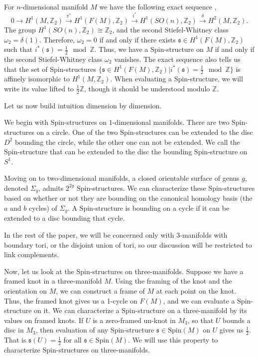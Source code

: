 \documentclass{article}
\newcommand{\Z}{{\mathbb Z}}
\def\be{\begin{equation}}
\def\ee{\end{equation}}
\numberwithin{corollary}{theorem}
\numberwithin{corollary}{proposition}
\begin{document}
For $n$-dimensional manifold $M$ we have the following exact sequence \cite{Milnor1965},
\be 
0 \rightarrow H^{1}(M, \Z_{2}) \xrightarrow{\pi^{*}} H^{1}(F(M), \Z_{2}) \xrightarrow{i^{*}} H^{1}(SO(n),\Z_{2}) \xrightarrow{\delta} H^{2}(M,\Z_{2}).
\ee
The group $ H^{1}(SO(n),\Z_{2})\cong \Z_{2}$, and the second Stiefel-Whitney class $\omega_{2}= \delta(1)$. Therefore, $\omega_{2}=0$ if and only if there exists $\mathfrak{s}\in H^{1}(F(M), \Z_{2}) $ such that $i^{*}(\mathfrak{s})=\frac{1}{2} \mod \Z$. Thus, we have a $\mathrm{Spin}$-structure on $M$ if and only if the second Stiefel-Whitney class $\omega_{2}$ vanishes. The exact sequence also tells us that the set of $\mathrm{Spin}$-structures $\{\mathfrak{s}\in H^{1}(F(M), \Z_{2}) \vert i^{*}(\mathfrak{s})= \frac{1}{2} \mod \Z  \}$ is affinely isomorphic to $H^{1}(M,\Z_{2})$. When evaluating a $\mathrm{Spin}$-structure, we will write its value lifted to $\frac{1}{2}\Z$, though it should be understood modulo $\Z$.

Let us now build intuition dimension by dimension.

We begin with $\mathrm{Spin}$-structures on $1$-dimensional manifolds. There are two $\mathrm{Spin}$-structures on a circle. One of the two $\mathrm{Spin}$-structures can be extended to the disc $D^{2}$ bounding the circle, while the other one can not be extended. We call the $\mathrm{Spin}$-structure that can be extended to the disc the bounding $\mathrm{Spin}$-structure on $S^{1}$.

Moving on to two-dimensional manifolds, a closed orientable surface of genus $g$, denoted $\Sigma_{g}$, admits $2^{2g}$ $\mathrm{Spin}$-structures. We can characterize these $\mathrm{Spin}$-structures based on whether or not they are bounding on the canonical homology basis (the $a$ and $b$ cycles) of $\Sigma_{g}$. A $\mathrm{Spin}$-structure is bounding on a cycle if it can be extended to a disc bounding that cycle.

In the rest of the paper, we will be concerned only with 3-manifolds with boundary tori, or the disjoint union of tori, so our discussion will be restricted to link complements. 

Now, let us look at the $\mathrm{Spin}$-structures on three-manifolds. Suppose we have a framed knot in a three-manifold $M$. Using the framing of the knot and the orientation on $M$, we can construct a frame of $M$ at each point on the knot.  Thus, the framed knot gives us a 1-cycle on $F(M)$, and we can evaluate a $\mathrm{Spin}$-structure on it. We can characterize a $\mathrm{Spin}$-structure on a three-manifold by its values on framed knots. If $U$ is a zero-framed un-knot in $M_{3}$, so that $U$ bounds a disc in $M_{3}$, then evaluation of any $\mathrm{Spin}$-structure $\mathfrak{s}\in \mathrm{Spin}(M)$ on $U$ gives us $\frac{1}{2} $. That is $\mathfrak{s}(U)=\frac{1}{2} $ for all $\mathfrak{s}\in \mathrm{Spin}(M)$. We will use this property to characterize $\mathrm{Spin}$-structures on three-manifolds.
\end{document}
